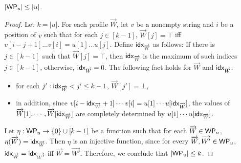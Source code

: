 
\begin{proposition}
$|\mathsf{WP}_{u}| \le |u|$.
\end{proposition}
%
\begin{proof}
Let $k=|u|$. For each profile $\overrightarrow{W}$, let $v$ be a nonempty string and $i$ be a position of $v$ such that for each $j \in [k-1]$, $\overrightarrow{W}[j] = \top$ iff $v[i-j+1] \dots v[i] = u[1] \dots u[j]$. Define ${\sf idx}_{\overrightarrow{W}}$ as follows: If there is $j \in [k-1]$ such that $\overrightarrow{W}[j]=\top$, then ${\sf idx}_{\overrightarrow{W}}$ is the maximum of such indices $j \in [k-1]$, otherwise, ${\sf idx}_{\overrightarrow{W}} =0$. The following fact holds for $\overrightarrow{W}$ and ${\sf idx}_{\overrightarrow{W}}$: 
\begin{itemize}
	\item for each $j': {\sf idx}_{\overrightarrow{W}} < j' \le k-1$, $\overrightarrow{W}[j']=\bot$,
	\item in addition, since $v[i-{\sf idx}_{\overrightarrow{W}}+1] \cdots v[i] = u[1] \cdots u[{\sf idx}_{\overrightarrow{W}}]$, the values of $\overrightarrow{W}[1],\cdots, \overrightarrow{W}[{\sf idx}_{\overrightarrow{W}}]$ are completely determined by $u[1] \cdots u[{\sf idx}_{\overrightarrow{W}}]$.
\end{itemize}
Let $\eta: \mathsf{WP}_{u} \rightarrow \{0\} \cup [k-1]$ be a function such that for each $\overrightarrow{W} \in \mathsf{WP}_{u}$, $\eta(\overrightarrow{W})={\sf idx}_{\overrightarrow{W}}$. Then $\eta$ is an injective function, since for every $\overrightarrow{W}, \overrightarrow{W'} \in \mathsf{WP}_{u}$, ${\sf idx}_{\overrightarrow{W}}  = {\sf idx}_{\overrightarrow{W'}}$ iff $\overrightarrow{W} = \overrightarrow{W'}$. Therefore, we conclude that  $ |\mathsf{WP}_{u}| \le k$.
\end{proof}

